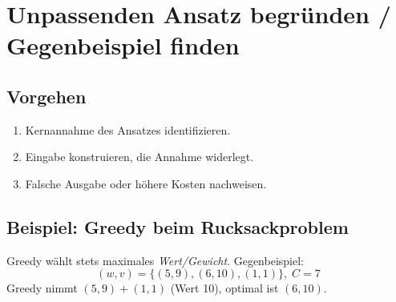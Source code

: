 \section{Unpassenden Ansatz begründen / Gegenbeispiel finden}
\subsection*{Vorgehen}
\begin{enumerate}
  \item Kernannahme des Ansatzes identifizieren.
  \item Eingabe konstruieren, die Annahme widerlegt.
  \item Falsche Ausgabe oder höhere Kosten nachweisen.
\end{enumerate}
\subsection*{Beispiel: Greedy beim Rucksackproblem}
Greedy wählt stets maximales \emph{Wert/Gewicht}.  Gegenbeispiel:
\[
  (w,v)=\{(5,9),(6,10),(1,1)\},\;C=7
\]
Greedy nimmt $(5,9)+(1,1)$ (Wert 10), optimal ist $(6,10)$.

